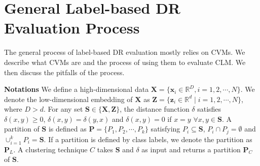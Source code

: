 



\section{General Label-based DR Evaluation Process}

\label{sec:cvmproblem}

The general process of label-based DR evaluation mostly relies on CVMs.
We describe what CVMs are and the process of using them to evaluate CLM. We then discuss the pitfalls of the process. 




\noindent
\textbf{Notations}
We define a high-dimensional data $\mathbf{X} = \{\mathbf{x}_i \in \mathbb{R}^D, i = 1, 2, \cdots, N\}$.
We denote the low-dimensional embedding of $\mathbf{X}$ as $\mathbf{Z} = \{\mathbf{z}_i \in \mathbb{R}^d \mid i = 1, 2, \cdots, N\}$, where $D > d$. 
For any set $\mathbf{S}\in\{\mathbf{X},\mathbf{Z}\}$, the distance function $\delta$ satisfies $\delta(x,y) \geq 0$, $\delta(x, y) = \delta(y,x)$ and $\delta(x,y)=0$ if $x=y$  $\forall x, y \in \mathbf{S}$.
A partition of $\mathbf{S}$ is defined as $\mathbf{P}=\{P_1, P_2, \cdots, P_k\}$ satisfying $P_i\subseteq \mathbf{S}$, $P_i \cap P_j = \emptyset$ and $\cup^{k}_{i=1}P_i = \mathbf{S}$.
If a partition is defined by class labels, we denote the partition as $\mathbf{P}_L$.
A clustering technique $C$ takes $\mathbf{S}$ and $\delta$ as input and returns a partition $\mathbf{P}_C$ of $\mathbf{S}$. 

